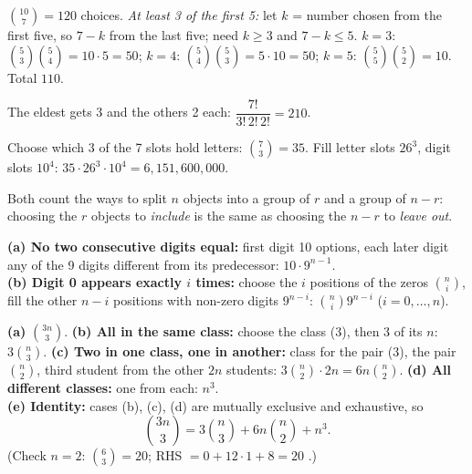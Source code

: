 \documentclass[11pt]{article}
\begin{document}
\begin{exbox}
$\binom{10}7=\boxed{120}$ choices. \emph{At least 3 of the first 5:} let $k$ = number chosen from the first five, so $7-k$ from the last five; need $k\ge3$ and $7-k\le5$. $k=3$: $\binom53\binom54=10\cdot5=50$; $k=4$: $\binom54\binom53=5\cdot10=50$; $k=5$: $\binom55\binom52=10$. Total $\boxed{110}$.
\end{exbox}

\begin{exbox}
The eldest gets 3 and the others 2 each: $\dfrac{7!}{3!\,2!\,2!}=\boxed{210}$.
\end{exbox}

\begin{exbox}
Choose which 3 of the 7 slots hold letters: $\binom73=35$. Fill letter slots $26^3$, digit slots $10^4$: $35\cdot26^3\cdot10^4=\boxed{6{,}151{,}600{,}000}$.
\end{exbox}

\begin{exbox}[1.7 Combinatorial explanation of $\binom nr=\binom n{n-r}$]
Both count the ways to split $n$ objects into a group of $r$ and a group of $n-r$: choosing the $r$ objects to \emph{include} is the same as choosing the $n-r$ to \emph{leave out}.
\end{exbox}

\begin{exbox}
\textbf{(a) No two consecutive digits equal:} first digit 10 options, each later digit any of the 9 digits different from its predecessor: $\boxed{10\cdot9^{n-1}}$.\\
\textbf{(b) Digit 0 appears exactly $i$ times:} choose the $i$ positions of the zeros $\binom ni$, fill the other $n-i$ positions with non-zero digits $9^{n-i}$: $\boxed{\binom ni9^{n-i}}$ ($i=0,\dots,n$).
\end{exbox}

\begin{exbox}
\textbf{(a)} $\binom{3n}3$. \textbf{(b) All in the same class:} choose the class (3), then 3 of its $n$: $3\binom n3$. \textbf{(c) Two in one class, one in another:} class for the pair (3), the pair $\binom n2$, third student from the other $2n$ students: $3\binom n2\cdot2n=6n\binom n2$. \textbf{(d) All different classes:} one from each: $n^3$.\\
\textbf{(e) Identity:} cases (b), (c), (d) are mutually exclusive and exhaustive, so
\[ \binom{3n}3=3\binom n3+6n\binom n2+n^3. \]
(Check $n=2$: $\binom63=20$; RHS $=0+12\cdot1+8=20$ \checkmark.)
\end{exbox}
\end{document}
